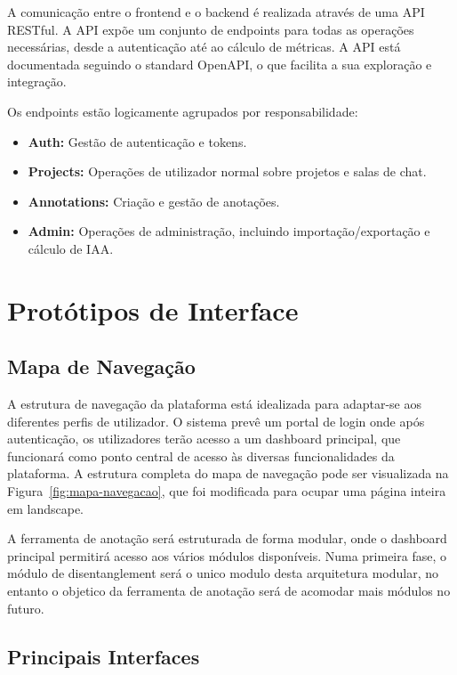 A comunicação entre o frontend e o backend é realizada através de uma API RESTful. A API expõe um conjunto de endpoints para todas as operações necessárias, desde a autenticação até ao cálculo de métricas. A API está documentada seguindo o standard OpenAPI, o que facilita a sua exploração e integração.

Os endpoints estão logicamente agrupados por responsabilidade:
\begin{itemize}
    \item \textbf{Auth:} Gestão de autenticação e tokens.
    \item \textbf{Projects:} Operações de utilizador normal sobre projetos e salas de chat.
    \item \textbf{Annotations:} Criação e gestão de anotações.
    \item \textbf{Admin:} Operações de administração, incluindo importação/exportação e cálculo de IAA.
\end{itemize}

\section{Protótipos de Interface}

\subsection{Mapa de Navegação}

A estrutura de navegação da plataforma está idealizada para adaptar-se aos diferentes perfis de utilizador. O sistema prevê um portal de login onde após autenticação, os utilizadores terão acesso a um dashboard principal, que funcionará como ponto central de acesso às diversas funcionalidades da plataforma. A estrutura completa do mapa de navegação pode ser visualizada na Figura~\ref{fig:mapa-navegacao}, que foi modificada para ocupar uma página inteira em landscape.

A ferramenta de anotação será estruturada de forma modular, onde o dashboard principal permitirá acesso aos vários módulos disponíveis. Numa primeira fase, o módulo de disentanglement será o unico modulo desta arquitetura modular, no entanto o objetico da ferramenta de anotação será de acomodar mais módulos no futuro.

\subsection{Principais Interfaces}

